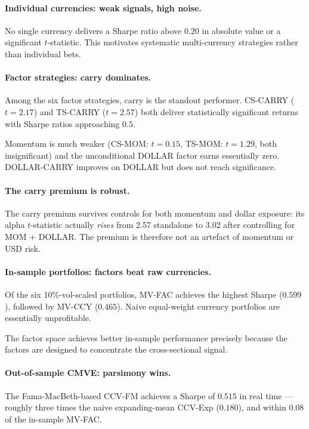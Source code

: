 \documentclass[a4paper,12pt]{article}
\begin{document}
\paragraph{Individual currencies: weak signals, high noise.}
No single currency delivers a Sharpe ratio above $0.20$ in absolute value or a significant
$t$-statistic. This motivates systematic multi-currency strategies rather than individual
bets.

\paragraph{Factor strategies: carry dominates.}
Among the six factor strategies, carry is the standout performer. CS-CARRY ($t = 2.17$)
and TS-CARRY ($t = 2.57$) both deliver statistically significant returns with Sharpe
ratios approaching $0.5$.

Momentum is much weaker (CS-MOM: $t = 0.15$, TS-MOM: $t = 1.29$, both insignificant) and
the unconditional DOLLAR factor earns essentially zero. DOLLAR-CARRY improves on DOLLAR
but does not reach significance.

\paragraph{The carry premium is robust.}
The carry premium survives controls for both momentum and dollar exposure: its alpha
$t$-statistic actually \emph{rises} from 2.57 standalone to 3.02 after controlling for
MOM + DOLLAR. The premium is therefore not an artefact of momentum or USD risk.

\paragraph{In-sample portfolios: factors beat raw currencies.}
Of the six 10\%-vol-scaled portfolios, MV-FAC achieves the highest Sharpe ($0.599$),
followed by MV-CCY ($0.465$). Naive equal-weight currency portfolios are essentially
unprofitable.

The factor space achieves better in-sample performance precisely because the factors are
designed to concentrate the cross-sectional signal.

\paragraph{Out-of-sample CMVE: parsimony wins.}
The Fama-MacBeth-based CCV-FM achieves a Sharpe of $0.515$ in real time --- roughly three
times the naive expanding-mean CCV-Exp ($0.180$), and within $0.08$ of the in-sample
MV-FAC.
\end{document}
